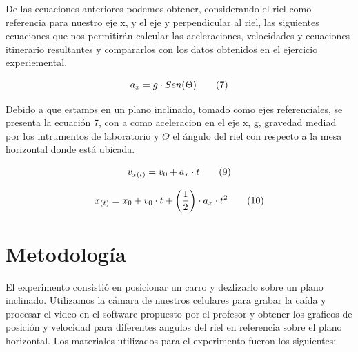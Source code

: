\documentclass[twocolumn,12pt]{article}
\begin{document}
	\vspace{1cm}
	
	De las ecuaciones anteriores podemos obtener, considerando el riel como referencia para nuestro eje x, y el eje y perpendicular al riel, las siguientes ecuaciones que nos permitirán calcular las aceleraciones, velocidades y ecuaciones itinerario resultantes y compararlos con los datos obtenidos en el ejercicio experiemental.
	\vspace{-1cm}
	\begin{center}
	\begin{equation}
	\centering
	a_{x} = g \cdot Sen (\Theta) \tag*{(7)} 
	\end{equation}
	
	\vspace{-0.4cm}  
	
	\centering{}
	\end{center}
	
	Debido a que estamos en un plano inclinado, tomado como ejes referenciales, se presenta la ecuación 7, con a como aceleracion en el eje x, g, gravedad mediad por los intrumentos de laboratorio y $\Theta$ el ángulo del riel con respecto a la mesa horizontal donde está ubicada.
	\vspace{-0.5cm}
	\begin{center}
	\begin{equation}
	\centering
	v_{x(t)} = v_{0} + a_{x}\cdot t \tag*{(9)} 
	\end{equation}
	
	\vspace{-0.4cm}  
	
	\centering{}
	
		\begin{equation}
	\centering
	x_{(t)} = x_{0} + v_{0} \cdot t + \left( \frac{1}{2} \right) \cdot a_{x}\cdot t^{2} \tag*{(10)} 
	\end{equation}
	
	\vspace{-0.4cm}  
	
	\centering{}
	\end{center}
	
	\section{Metodología}
	El experimento consistió en posicionar un carro y dezlizarlo sobre un plano inclinado. Utilizamos la cámara de nuestros celulares para grabar la caída y procesar el video en el software propuesto por el profesor y obtener los graficos de posición y velocidad para diferentes angulos del riel en referencia sobre el plano horizontal. Los materiales utilizados para el experimento fueron los siguientes:
	
\end{document}
